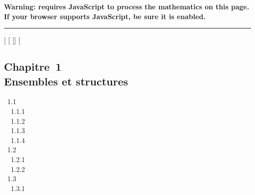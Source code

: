 \textbf{Warning: 
requires JavaScript to process the mathematics on this page.\\ If your
browser supports JavaScript, be sure it is enabled.}

\begin{center}\rule{3in}{0.4pt}\end{center}

{[}
{[}
{[}{]}
{[}

\subsection{Chapitre~1\\Ensembles et structures}

~1.1  \\ ~~1.1.1
 \\ ~~1.1.2
 \\ ~~1.1.3
 \\ ~~1.1.4
 \\ ~1.2
 \\
~~1.2.1  \\
~~1.2.2  \\
~1.3  \\ ~~1.3.1

